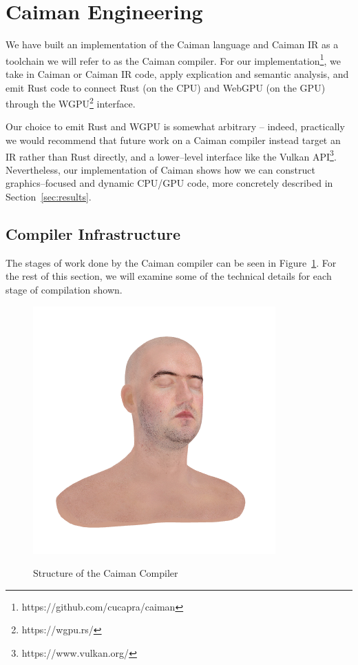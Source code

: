 \section{Caiman Engineering}
\label{sec:engineering}

We have built an implementation of the Caiman language and Caiman IR as a toolchain we will refer to as the Caiman compiler.  For our implementation\footnote{https://github.com/cucapra/caiman}, we take in Caiman or Caiman IR code, apply explication and semantic analysis, and emit Rust code to connect Rust (on the CPU) and WebGPU (on the GPU) through the WGPU\footnote{https://wgpu.rs/} interface.

Our choice to emit Rust and WGPU is somewhat arbitrary -- indeed, practically we would recommend that future work on a Caiman compiler instead target an IR rather than Rust directly, and a lower--level interface like the Vulkan API\footnote{https://www.vulkan.org/}.  Nevertheless, our implementation of Caiman shows how we can construct graphics--focused and dynamic CPU/GPU code, more concretely described in Section~\ref{sec:results}.

\subsection{Compiler Infrastructure}
\label{subsec:compilation}


The stages of work done by the Caiman compiler can be seen in Figure~\ref{fig:caiman-compiler}.  For the rest of this section, we will examine some of the technical details for each stage of compilation shown.

\begin{figure}
\includegraphics[width=.7\linewidth]{fig/texture.png}
\label{fig:caiman-compiler}
\caption{Structure of the Caiman Compiler}
\end{figure}



